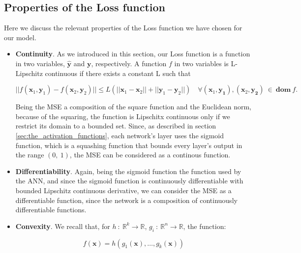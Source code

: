         \subsection{Properties of the Loss function} %
        \label{sub:properties_of_the_loss_function}
            Here we discuss the relevant properties of the Loss function we have chosen for our model.

            \begin{itemize}
                \item \textbf{Continuity}. As we introduced in this section, our Loss function is a function in
                two variables, $\hat{\mathbf{y}}$ and $\mathbf{y}$, respectively. A function $f$ in two variables
                is L-Lipschitz continuous if there exists a constant L such that

                \begin{equation*}
                    || f(\mathbf{x}_1, \mathbf{y}_1) - f(\mathbf{x}_2, \mathbf{y}_2) || \le L(|| \mathbf{x}_1 -
                    \mathbf{x}_2|| + || \mathbf{y}_1 - \mathbf{y}_2||) \quad \forall (\mathbf{x}_1, \mathbf{y_1}),
                    (\mathbf{x}_2, \mathbf{y_2}) \ \in \ \mathbf{dom} \ f.
                \end{equation*}

                Being the MSE a composition of the square function and the Euclidean norm, because of the squaring,
                the function is Lipschitx continuous only if we restrict its domain to a bounded set. Since, as
                described in section \ref{sec:the_activation_functions}, each network's layer uses the sigmoid
                function, which is a squashing function that bounds every layer's output in the range
                $\left ( 0,\ 1 \right )$, the MSE can be considered as a continous function.
                \item \textbf{Differentiability}. Again, being the sigmoid function the function used by the ANN,
                and since the sigmoid function is continuously differentiable with bounded Lipschitz continuous
                derivative, we can consider the MSE as a differentiable function, since the network is a
                composition of continuously differentiable functions.
                \item \textbf{Convexity}. We recall that, for $h \ : \ \mathbb{R}^k \to \mathbb{R}$, $g_i \ : \
                \mathbb{R}^n \to \mathbb{R}$, the function:

                \begin{equation*}
                    f(\mathbf{x}) = h(g_1(\mathbf{x}), \ldots, g_k(\mathbf{x}))
                \end{equation*}


\end{itemize}
